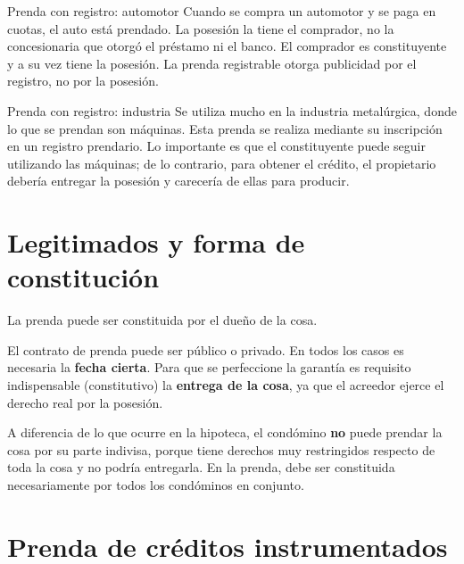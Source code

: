 \documentclass[12pt,oneside]{book}
\begin{document}
\begin{example}{Prenda con registro: automotor}
Cuando se compra un automotor y se paga en cuotas, el auto está prendado. La posesión la tiene el comprador, no la concesionaria que otorgó el préstamo ni el banco. El comprador es constituyente y a su vez tiene la posesión. La prenda registrable otorga publicidad por el registro, no por la posesión.
\end{example}

\begin{example}{Prenda con registro: industria}
Se utiliza mucho en la industria metalúrgica, donde lo que se prendan son máquinas. Esta prenda se realiza mediante su inscripción en un registro prendario. Lo importante es que el constituyente puede seguir utilizando las máquinas; de lo contrario, para obtener el crédito, el propietario debería entregar la posesión y carecería de ellas para producir.
\end{example}

\section{Legitimados y forma de constitución}

La prenda puede ser constituida por el dueño de la cosa.

\begin{important}
El contrato de prenda puede ser público o privado. En todos los casos es necesaria la \textbf{fecha cierta}. Para que se perfeccione la garantía es requisito indispensable (constitutivo) la \textbf{entrega de la cosa}, ya que el acreedor ejerce el derecho real por la posesión.
\end{important}

\begin{note}
A diferencia de lo que ocurre en la hipoteca, el condómino \textbf{no} puede prendar la cosa por su parte indivisa, porque tiene derechos muy restringidos respecto de toda la cosa y no podría entregarla. En la prenda, debe ser constituida necesariamente por todos los condóminos en conjunto.
\end{note}

\section{Prenda de créditos instrumentados}
\end{document}
